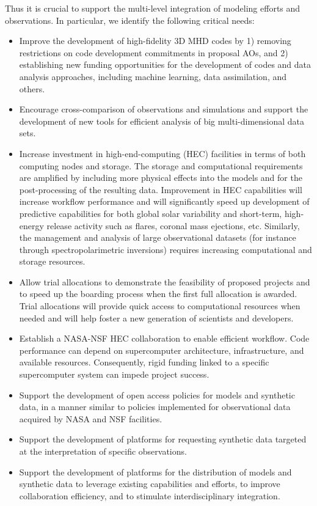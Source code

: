 \documentclass[]{article}
\begin{document}
Thus it is crucial to support the multi-level integration of modeling efforts and observations. In particular, we identify the following critical needs:
\begin{itemize}
    \item Improve the development of high-fidelity 3D MHD codes by 1) removing restrictions on code development commitments in proposal AOs, and 2) establishing new funding opportunities for the development of codes and data analysis approaches, including machine learning, data assimilation, and others.
    \item Encourage cross-comparison of observations and simulations and support the development of new tools for efficient analysis of big multi-dimensional data sets.
    \item Increase investment in high-end-computing (HEC) facilities in terms of both computing nodes and storage. The storage and computational requirements are amplified by including more physical effects into the models and for the post-processing of the resulting data. Improvement in HEC capabilities will increase workflow performance and will significantly speed up development of predictive capabilities for both global solar variability and short-term, high-energy release activity such as flares, coronal mass ejections, etc. Similarly, the management and analysis of large observational datasets (for instance through spectropolarimetric inversions) requires increasing computational and storage resources.
    \item Allow trial allocations to demonstrate the feasibility of proposed projects and to speed up the boarding process when the first full allocation is awarded. Trial allocations will provide quick access to computational resources when needed and will help foster a new generation of scientists and developers.
    \item Establish a NASA-NSF HEC collaboration to enable efficient workflow. Code performance can depend on supercomputer architecture, infrastructure, and available resources. Consequently, rigid funding linked to a specific supercomputer system can impede project success.
    \item Support the development of open access policies for models and synthetic data, in a manner similar to policies implemented for observational data acquired by NASA and NSF facilities.
    \item Support the development of platforms for requesting synthetic data targeted at the interpretation of specific observations. 
    \item Support the development of platforms for the distribution of models and synthetic data to leverage existing capabilities and efforts, to improve collaboration efficiency, and to stimulate interdisciplinary integration.

\end{itemize}
\end{document}
